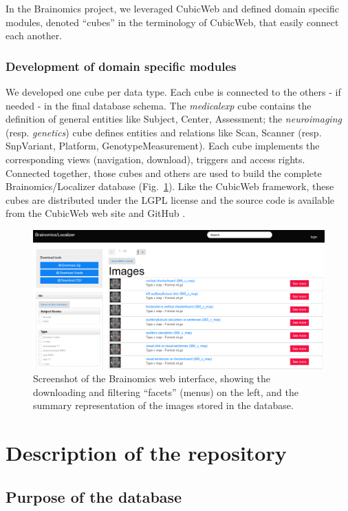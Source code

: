 \documentclass[review]{elsarticle}
\begin{document}
In the Brainomics project, we leveraged CubicWeb and defined domain specific modules, denoted ``cubes'' in the terminology of CubicWeb, that easily connect each another.


\subsubsection{Development of domain specific modules}

We developed one cube per data type. Each cube is connected to the others - if needed - in the final database schema. The \textit{medicalexp} cube contains the definition of general entities like Subject, Center, Assessment; the \textit{neuroimaging} (resp. \textit{genetics}) cube defines entities and relations like Scan, Scanner (resp. SnpVariant, Platform, GenotypeMeasurement). Each cube implements the corresponding views (navigation, download), triggers and access rights. Connected together, those cubes and others are used to build the complete Brainomics/Localizer database (Fig.~\ref{fig:ui}). Like the CubicWeb framework, these cubes are distributed under the LGPL license and the source code is available from the CubicWeb web site \cite{CubicWeb} and GitHub \cite{Localizer}.

\begin{figure}[ht!]
    \includegraphics[width=\textwidth]{ui1}
    \caption{Screenshot of the Brainomics web interface, showing the downloading and filtering ``facets'' (menus) on the left, and the summary representation of the images stored in the database.}
    \label{fig:ui}
\end{figure}


\section{Description of the repository}

\subsection{Purpose of the database}
\end{document}
